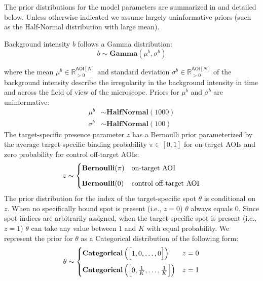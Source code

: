 The prior distributions for the model parameters are summarized in  and detailed below. Unless otherwise indicated we assume largely uninformative priors (such as the Half-Normal distribution with large mean). 

Background intensity $b$ follows a Gamma distribution:
%
\begin{equation}
    b \sim \mathbf{Gamma}(\mu^b, \sigma^b)
\end{equation}

\noindent
where the mean $\mu^b \in \mathbb{R}_{>0}^{\mathsf{AOI}[N]}$ and standard deviation $\sigma^b \in \mathbb{R}_{>0}^{\mathsf{AOI}[N]}$ of the background intensity describe the irregularity in the background intensity in time and across the field of view of the microscope. Priors for $\mu^b$ and $\sigma^b$ are uninformative:
%
\begin{subequations}
\begin{align}
    \mu^b &\sim \mathbf{HalfNormal}(1000) \\
    \sigma^b &\sim \mathbf{HalfNormal}(100)
\end{align}
\end{subequations}
%
The target-specific presence parameter $z$ has a Bernoulli prior parameterized by the average target-specific binding probability $\pi \in [0, 1] $ for on-target AOIs and zero probability for control off-target AOIs:
%
\begin{equation}
    z \sim
    \begin{cases}
        \mathbf{Bernoulli}(\pi) & \text{on-target AOI} \\
        \mathbf{Bernoulli}(0) & \text{control off-target AOI} \rule{0pt}{4ex}
    \end{cases}
\end{equation}
%
The prior distribution for the index of the target-specific spot $\theta$ is conditional on $z$. When no specifically bound spot is present (i.e., $z = 0$) $\theta$ always equals 0. Since spot indices are arbitrarily assigned, when the target-specific spot is present (i.e., $z = 1$) $\theta$ can take any value between $1$ and $K$ with equal probability. We represent the prior for $\theta$ as a Categorical distribution of the following form:
%
\begin{equation}
    \theta \sim
    \begin{cases}
        \mathbf{Categorical}\left( \begin{bmatrix} 1, 0, \dots, 0 \end{bmatrix} \right) & z = 0 \\
        \mathbf{Categorical}\left( \begin{bmatrix} 0, \frac{1}{K}, \dots, \frac{1}{K} \end{bmatrix} \right) & z = 1 \rule{0pt}{4ex}
    \end{cases}
\end{equation}

